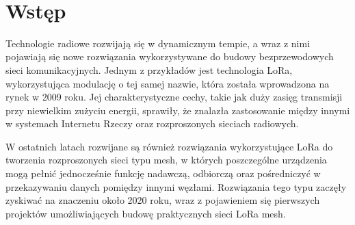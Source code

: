 \documentclass[12pt,a4paper,twoside]{report}
\theoremstyle{definition} %
\begin{document}
    \linespread{1.3}
    \newpage 


    \thispagestyle{empty} %
    ~\vfill
	\newpage
    
	\renewcommand{\contentsname}{\LARGE Spis treści}
    \setcounter{tocdepth}{1}
    \tableofcontents
    \cleardoublepage %


    \cleardoublepage

	
	\chapter*{Wstęp} 
Technologie radiowe rozwijają się w dynamicznym tempie, a wraz z nimi pojawiają się nowe rozwiązania wykorzystywane do budowy bezprzewodowych sieci komunikacyjnych. Jednym z przykładów jest technologia LoRa, wykorzystująca modulację o tej samej nazwie, która została wprowadzona na rynek w 2009 roku. Jej charakterystyczne cechy, takie jak duży zasięg transmisji przy niewielkim zużyciu energii, sprawiły, że znalazła zastosowanie między innymi w systemach Internetu Rzeczy oraz rozproszonych sieciach radiowych.

W ostatnich latach rozwijane są również rozwiązania wykorzystujące LoRa do tworzenia rozproszonych sieci typu mesh, w których poszczególne urządzenia mogą pełnić jednocześnie funkcję nadawczą, odbiorczą oraz pośredniczyć w przekazywaniu danych pomiędzy innymi węzłami. Rozwiązania tego typu zaczęły zyskiwać na znaczeniu około 2020 roku, wraz z pojawieniem się pierwszych projektów umożliwiających budowę praktycznych sieci LoRa mesh.
\end{document}
